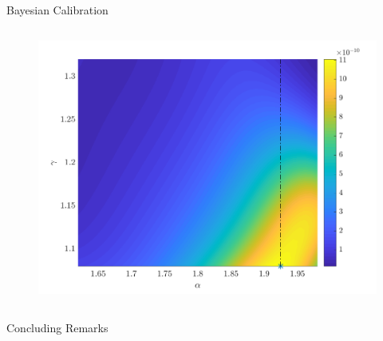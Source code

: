 \documentclass[xcolor={x11names,table},compress,svgnames,mathserif]{beamer}
\renewcommand{\(}{\begin{columns}}
\renewcommand{\)}{\end{columns}}
\newcommand{\<}[1]{\begin{column}{#1}}
\renewcommand{\>}{\end{column}}
\begin{document}
\begin{frame}{Bayesian Calibration}
\begin{columns}
\begin{column}{0.45\textwidth}
\begin{center}
\vspace{-20mm}
\begin{figure}[htbp]
\hspace{3mm}
  \includegraphics[width=1.0\textwidth]{./Figures/gl}
  \end{figure}
\end{center}

\end{column}
\end{columns}

\end{frame}



\begin{frame}{Concluding Remarks}


\end{frame}
\end{document}
